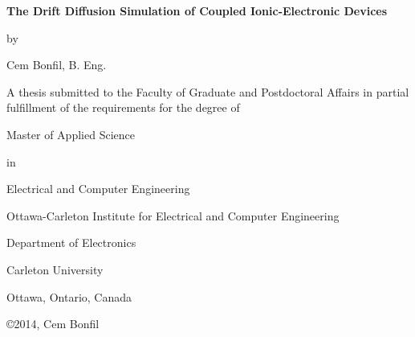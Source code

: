 \documentclass[11pt, a4paper, oneside]{Thesis} %
\begin{document}
\begin{titlepage}
\begin{center}
\LARGE
\textbf{The Drift Diffusion Simulation of Coupled Ionic-Electronic Devices}
\vspace{6 mm}
\large 
\begin{center}
by 
\vspace{6 mm}
\end{center}
\large  
Cem Bonfil, B. Eng.
\end{center}



\large  
\begin{center}
A thesis submitted to the
Faculty of Graduate and Postdoctoral Affairs
in partial fulfillment of
the requirements for the degree of
\end{center}

\vspace{6 mm}
\large  
\begin{center}
Master of Applied Science
\end{center}
\large  
\begin{center}
in
\end{center}
\large  
\begin{center}
Electrical and Computer Engineering
\end{center}

\vspace{6 mm}

\large  
\begin{center}
Ottawa-Carleton Institute for Electrical and Computer Engineering
\end{center}

\large  
\begin{center}
Department of Electronics
\end{center}
\large  
\begin{center}
Carleton University
\end{center}
\large  
\begin{center}
Ottawa, Ontario, Canada
\end{center}

\vspace{6 mm}
\large  
\begin{center}
\copyright 2014, Cem Bonfil
\end{center}

\end{titlepage}



\newpage %
\end{document}
